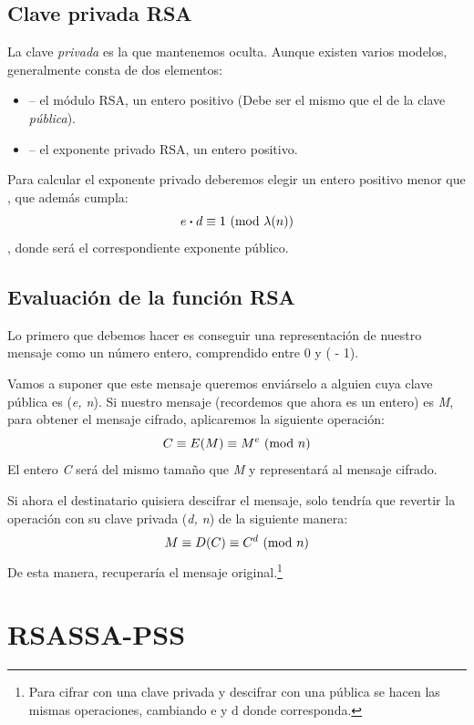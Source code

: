 \subsection{Clave privada RSA}

La clave \emph{privada} es la que mantenemos oculta. Aunque existen varios modelos, generalmente consta de dos elementos:
\begin{itemize}
  \item {} -- el módulo RSA, un entero positivo (Debe ser el mismo que el de la clave \emph{pública}).
  \item {} -- el exponente privado RSA, un entero positivo.
\end{itemize}

Para calcular el exponente privado  deberemos elegir un entero positivo menor que , que además cumpla:
\[ e \boldsymbol{\cdot} d \equiv 1 \ (\mathrm{mod}\ \lambda(n)) \]
, donde  será el correspondiente exponente público. \emph{\parencite{Reference11}}

\subsection{Evaluación de la función RSA}

Lo primero que debemos hacer es conseguir una representación de nuestro mensaje como un número entero, comprendido entre 0 y ( - 1).

Vamos a suponer que este mensaje queremos enviárselo a alguien cuya clave pública es (\emph{e, n}).
Si nuestro mensaje (recordemos que ahora es un entero) es \emph{M}, para obtener el mensaje cifrado, aplicaremos la siguiente operación:
\[ C \equiv E(M) \equiv M^e \ (\mathrm{mod}\ n) \]
El entero \emph{C} será del mismo tamaño que \emph{M} y representará al mensaje cifrado.

Si ahora el destinatario quisiera descifrar el mensaje, solo tendría que revertir la operación con su clave privada (\emph{d, n}) de la siguiente manera:
\[ M \equiv D(C) \equiv C^d \ (\mathrm{mod}\ n) \]
De esta manera, recuperaría el mensaje original.\footnote{Para cifrar con una clave privada y descifrar con una pública se hacen las mismas operaciones, cambiando e y d donde corresponda.} \emph{\parencite{Reference12}}


\section{RSASSA-PSS}

